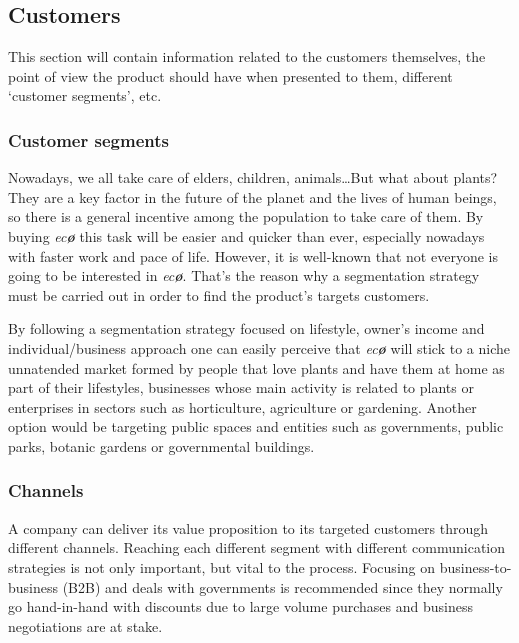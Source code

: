 \documentclass[english,runningheads,a4paper]{llncs}[2018/03/10]
\begin{document}

    \subsection*{Customers}

    This section will contain information related to the customers themselves,
    the point of view the product should have when presented to them, different
    `customer segments', etc.


        \subsubsection*{Customer segments}

        Nowadays, we all take care of elders, children, animals\ldots But what
        about plants? They are a key factor in the future of the planet and the
        lives of human beings, so there is a general incentive among the
        population to take care of them. By buying \textit{ec\textbf{\o}} this
        task will be easier and quicker than ever, especially nowadays with
        faster work and pace of life. However, it is well-known that not
        everyone is going to be interested in \textit{ec\textbf{\o}}. That's the
        reason why a segmentation strategy must be carried out in order to find
        the product's targets customers.

        By following a segmentation strategy focused on lifestyle, owner's
        income and individual/business approach one can easily perceive that
        \textit{ec\textbf{\o}} will stick to a niche unnatended market formed by
        people that love plants and have them at home as part of their
        lifestyles, businesses whose main activity is related to plants or
        enterprises in sectors such as horticulture, agriculture or gardening.
        Another option would be targeting public spaces and entities such as
        governments, public parks, botanic gardens or governmental buildings.


        \subsubsection*{Channels}

        A company can deliver its value proposition to its targeted customers
        through different channels. Reaching each different segment with
        different communication strategies is not only important, but vital to
        the process. Focusing on business-to-business (B2B) and deals with
        governments is recommended since they normally go hand-in-hand with
        discounts due to large volume purchases and business negotiations are at
        stake.
\end{document}
